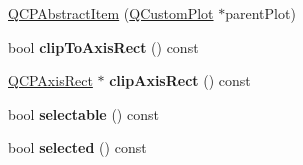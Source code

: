 \begin{DoxyCompactItemize}
\item 
\hyperlink{classQCPAbstractItem_a9922507d8b4503a1fe1ed0b1030e23b6}{Q\+C\+P\+Abstract\+Item} (\hyperlink{classQCustomPlot}{Q\+Custom\+Plot} $\ast$parent\+Plot)
\item 
bool {\bfseries clip\+To\+Axis\+Rect} () const \hypertarget{classQCPAbstractItem_a5b0ea171823033bcb8aee81f4a034871}{}\label{classQCPAbstractItem_a5b0ea171823033bcb8aee81f4a034871}

\item 
\hyperlink{classQCPAxisRect}{Q\+C\+P\+Axis\+Rect} $\ast$ {\bfseries clip\+Axis\+Rect} () const \hypertarget{classQCPAbstractItem_a37f86618740b5047eae23eedb2de061a}{}\label{classQCPAbstractItem_a37f86618740b5047eae23eedb2de061a}

\item 
bool {\bfseries selectable} () const \hypertarget{classQCPAbstractItem_a9189e752025533e1595eaade0009a3bc}{}\label{classQCPAbstractItem_a9189e752025533e1595eaade0009a3bc}

\item 
bool {\bfseries selected} () const \hypertarget{classQCPAbstractItem_a225865808640d8d9a7dd19f09a2e93f2}{}\label{classQCPAbstractItem_a225865808640d8d9a7dd19f09a2e93f2}


\end{DoxyCompactItemize}
